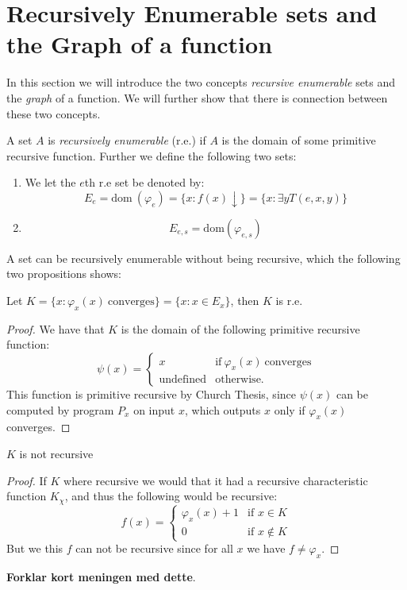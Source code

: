 \documentclass[../main.tex]{subfiles}
\begin{document}
\section{Recursively Enumerable sets and the Graph of a function}
In this section we will introduce the two concepts \textit{recursive
enumerable} sets and the \textit{graph} of a function. We will further show
that there is connection between these two concepts.
\begin{defi}
	A set $A$ is \textit{recursively enumerable} (r.e.) if $A$ is the domain of some
	primitive recursive function. Further we define the following two sets:
	\begin{enumerate}
		\item We let the $e$th r.e set be denoted by:
			$$E_e=\text{dom}\ (\varphi_e)= \{x:f(x)\downarrow\}=\{x:\exists
			y T(e,x,y)\}$$
		\item \[E_{e,s}=\text{dom} (\varphi_{e,s})\]
	\end{enumerate}
\end{defi}
A set can be recursively enumerable without being recursive, which the
following two propositions shows:
\begin{prop}
	Let $K=\{x:\varphi_x(x)\ \text{converges}\}=\{x:x\in E_x\}$, then $K$
	is r.e.
\end{prop}
\begin{proof}
	We have that $K$ is the domain of the following primitive recursive
	function:
	\[\psi(x)=\begin{cases}
		x &\text{if}\ \varphi_x(x)\ \text{converges}\\
		\text{undefined} &\text{otherwise.}
	\end{cases}\]
	This function is primitive recursive by Church Thesis, since $\psi(x)$
	can be computed by program $P_x$ on input $x$, which outputs $x$ only
	if $\varphi_x(x)$ converges.
\end{proof}
\begin{prop}
	$K$ is not recursive
\end{prop}
\begin{proof}
	If $K$ where recursive we would that it had a recursive characteristic
	function $K_\chi$, and thus the following would be recursive:
	\[f(x)=\begin{cases}
		\varphi_x(x)+1 & \text{if } x\in K\\
		0 & \text{if } x\not \in K
	\end{cases}\]
	But we this $f$ can not be recursive since for all $x$ we have $f\not
	=\varphi_x$.
\end{proof}
\textbf{Forklar kort meningen med dette}.
\end{document}
